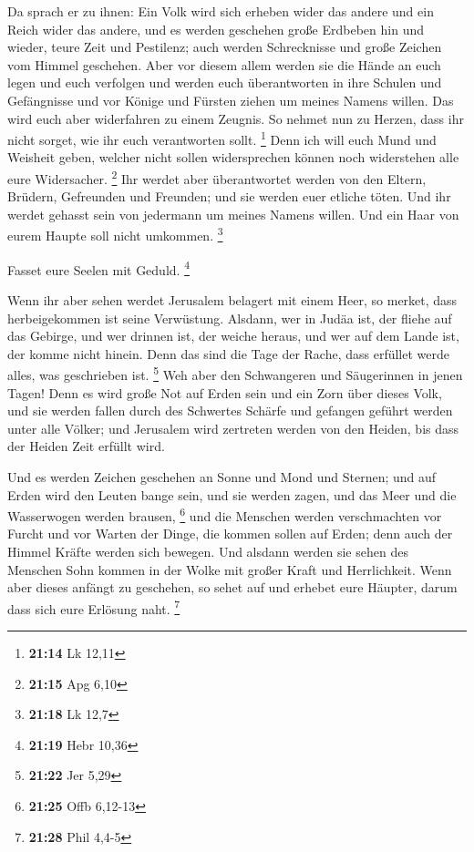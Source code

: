  Da sprach er zu ihnen: Ein Volk wird sich erheben wider
das andere und ein Reich wider das andere,  und es werden
geschehen große Erdbeben hin und wieder, teure Zeit und Pestilenz; auch
werden Schrecknisse und große Zeichen vom Himmel geschehen.
 Aber vor diesem allem werden sie die Hände an euch legen
und euch verfolgen und werden euch überantworten in ihre Schulen und
Gefängnisse und vor Könige und Fürsten ziehen um meines Namens willen.
 Das wird euch aber widerfahren zu einem Zeugnis.
 So nehmet nun zu Herzen, dass ihr nicht sorget, wie ihr
euch verantworten sollt. \footnote{\textbf{21:14} Lk 12,11}
 Denn ich will euch Mund und Weisheit geben, welcher
nicht sollen widersprechen können noch widerstehen alle eure
Widersacher. \footnote{\textbf{21:15} Apg 6,10}  Ihr
werdet aber überantwortet werden von den Eltern, Brüdern, Gefreunden und
Freunden; und sie werden euer etliche töten.  Und ihr
werdet gehasst sein von jedermann um meines Namens willen.
 Und ein Haar von eurem Haupte soll nicht umkommen.
\footnote{\textbf{21:18} Lk 12,7}

 Fasset eure Seelen mit Geduld. \footnote{\textbf{21:19}
  Hebr 10,36}

 Wenn ihr aber sehen werdet Jerusalem belagert mit einem
Heer, so merket, dass herbeigekommen ist seine Verwüstung.
 Alsdann, wer in Judäa ist, der fliehe auf das Gebirge,
und wer drinnen ist, der weiche heraus, und wer auf dem Lande ist, der
komme nicht hinein.  Denn das sind die Tage der Rache,
dass erfüllet werde alles, was geschrieben ist. \footnote{\textbf{21:22}
  Jer 5,29}  Weh aber den Schwangeren und Säugerinnen in
jenen Tagen! Denn es wird große Not auf Erden sein und ein Zorn über
dieses Volk,  und sie werden fallen durch des Schwertes
Schärfe und gefangen geführt werden unter alle Völker; und Jerusalem
wird zertreten werden von den Heiden, bis dass der Heiden Zeit erfüllt
wird.

 Und es werden Zeichen geschehen an Sonne und Mond und
Sternen; und auf Erden wird den Leuten bange sein, und sie werden zagen,
und das Meer und die Wasserwogen werden brausen, \footnote{\textbf{21:25}
  Offb 6,12-13}  und die Menschen werden verschmachten
vor Furcht und vor Warten der Dinge, die kommen sollen auf Erden; denn
auch der Himmel Kräfte werden sich bewegen.  Und alsdann
werden sie sehen des Menschen Sohn kommen in der Wolke mit großer Kraft
und Herrlichkeit.  Wenn aber dieses anfängt zu geschehen,
so sehet auf und erhebet eure Häupter, darum dass sich eure Erlösung
naht. \footnote{\textbf{21:28} Phil 4,4-5}

